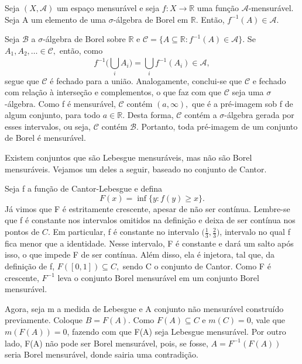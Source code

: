 \documentclass[measure_theory.tex]{subfiles}
\begin{document}
\begin{prop*}
	Seja \((X, \mathcal{A})\) um espaço mensurável e seja \(f:X\rightarrow \mathbb{R}\) uma função \(\mathcal{A}\)-mensurável. Seja A um elemento de uma \(\sigma \)-álgebra de Borel em \(\mathbb{R}.\) Então, \(f^{-1}(A)\in \mathcal{A}.\)
\end{prop*}
\begin{proof*}
	Seja \(\mathcal{B}\) a \(\sigma \)-álgebra de Borel sobre \(\mathbb{R}\) e \(\mathcal{C} = \{A\subseteq \mathbb{R}: f^{-1}(A)\in \mathcal{A}\}.\) Se \(A_{1}, A_2,\dotsc \in \mathcal{C},\) então, como
	\[
		f^{-1}\biggl(\bigcup_{i}^{}A_{i}\biggr) = \bigcup_{i}^{}f^{-1}(A_{i})\in \mathcal{A},
	\]
	segue que \(\mathcal{C}\) é fechado para a união. Analogamente, conclui-se que \(\mathcal{C}\) e fechado com relação à interseção e complementos, o que faz com que \(\mathcal{C}\) seja uma \(\sigma \)-álgebra.
	Como f é mensurável, \(\mathcal{C}\) contém \((a, \infty),\) que é a pré-imagem sob f de algum conjunto, para todo \(a\in \mathbb{R}.\) Desta forma, \(\mathcal{C}\) contém a \(\sigma \)-álgebra gerada por esses intervalos,
	ou seja, \(\mathcal{C}\) contém \(\mathcal{B}\). Portanto, toda pré-imagem de um conjunto de Borel é mensurável. \qedsymbol
\end{proof*}
Existem conjuntos que são Lebesgue mensuráveis, mas não são Borel mensuráveis. Vejamos um deles a seguir, baseado no conjunto de Cantor.
\begin{example}
	Seja f a função de Cantor-Lebesgue e defina
	\[
		F(x) = \inf_{}\{y: f(y)\geq x\}.
	\]
	Já vimos que F é estritamente crescente, apesar de não ser contínua. Lembre-se que f é constante nos intervalos omitidos na definição e deixa de ser contínua nos pontos de \(C\). Em particular, f é constante no intervalo
	\(\biggl(\frac{1}{3}, \frac{2}{3}\biggr)\), intervalo no qual f fica menor que a identidade. Nesse intervalo, F é constante e dará um salto após isso, o que impede F de ser contínua. Além disso, ela é injetora, tal que, da definição de f, \(F([0, 1])\subseteq C,\) sendo C
	o conjunto de Cantor. Como F é crescente, \(F^{-1}\) leva o conjunto Borel mensurável em um conjunto Borel mensurável.

	Agora, seja m a medida de Lebesgue e A conjunto não mensurável construído previamente. Coloque \(B = F(A)\). Como \(F(A)\subseteq C\) e \(m(C) = 0\),
	vale que \(m(F(A)) = 0\), fazendo com que F(A) seja Lebesgue mensurável. Por outro lado, F(A) não pode ser Borel mensurável, pois, se fosse, \(A = F^{-1}(F(A))\) seria Borel mensurável, donde sairia uma contradição.
\end{example}
\end{document}
